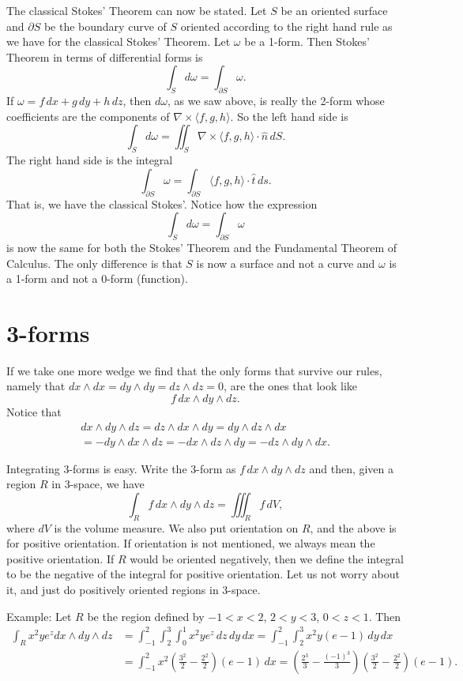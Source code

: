 \documentclass[12pt]{article}
\begin{document}
The classical Stokes' Theorem can now be stated.  Let $S$ be an oriented
surface and $\partial S$ be the boundary curve of $S$ oriented according to
the right hand rule as we have for the classical Stokes' Theorem.
Let $\omega$ be a 1-form.  Then Stokes' Theorem in terms of
differential forms is
\[
\int_S d \omega = \int_{\partial S} \omega .
\]
If $\omega = f \, dx + g \, dy + h \, dz$, then
$d \omega$, as we saw above, is really the 2-form whose coefficients are
the components of $\nabla \times \langle f , g, h \rangle$.  So the left 
hand side is
\[
\int_S d \omega = \iint_S 
\nabla \times \langle f , g, h \rangle \cdot \hat{n} \, dS .
\]
The right hand side is the integral 
\[
\int_{\partial S} \omega =
\int_{\partial S} 
\langle f , g, h \rangle \cdot \hat{t} \, ds .
\]
That is,
we have the classical Stokes'.
Notice how the expression
\[
\int_S d \omega = \int_{\partial S} \omega
\]
is now the same for both the Stokes' Theorem and the Fundamental Theorem of
Calculus.  The only difference is that $S$ is now a surface and not a curve and 
$\omega$ is a 1-form and not a 0-form (function).

\section*{3-forms}

If we take one more wedge we find that the only forms that survive our
rules, namely that $dx \wedge dx = dy \wedge dy = dz \wedge dz = 0$,
are the ones that look like
\[
f \, dx \wedge dy \wedge dz .
\]
Notice that
\begin{multline*}
dx \wedge dy \wedge dz
=
dz \wedge dx \wedge dy
=
dy \wedge dz \wedge dx
\\
=
- 
dy \wedge dx \wedge dz
=
-
dx \wedge dz \wedge dy
=
-
dz \wedge dy \wedge dx .
\end{multline*}

Integrating 3-forms is easy.  Write the 3-form as $f \, dx \wedge dy \wedge
dz$ and then, given a region $R$ in 3-space, we have
\[
\int_R f \, dx \wedge dy \wedge dz
=
\iiint_R f\, dV ,
\]
where $dV$ is the volume measure.  We also put orientation on $R$, and
the above is for positive orientation.  If orientation is not mentioned, we
always mean the positive orientation.  If $R$ would be
oriented negatively, then we define the integral
to be the negative of the integral for positive orientation.
Let us not worry about it, and just do positively oriented
regions in 3-space.

Example:  Let $R$ be the region defined by $-1 < x < 2$, $2 < y < 3$, $0<z<1$.
Then
\begin{equation*}
\begin{split}
\int_R x^2 y e^z dx \wedge dy \wedge dz
& =
\int_{-1}^2 \int_2^3 \int_0^1 
x^2 y e^z \, dz \, dy \, dx
=
\int_{-1}^2 \int_2^3 
x^2 y (e-1) \, dy \, dx
\\
& =
\int_{-1}^2
x^2 \left(\frac{3^2}{2} - \frac{2^2}{2}\right) (e-1) \, dx
=
\left( \frac{2^3}{3} - \frac{(-1)^3}{3} \right) \left(\frac{3^2}{2} -
\frac{2^2}{2}\right) (e-1) .
\end{split}
\end{equation*}
\end{document}
